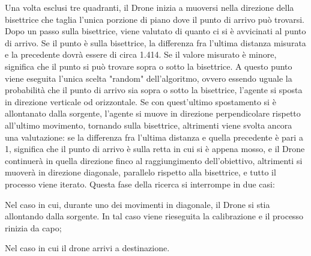 Una volta esclusi tre quadranti, il Drone inizia a muoversi nella direzione della bisettrice che taglia l'unica porzione di piano dove il punto di arrivo può trovarsi. Dopo un passo sulla bisettrice, viene valutato di quanto ci si è avvicinati al punto di arrivo. Se il punto è sulla bisettrice, la differenza fra l'ultima distanza misurata e la precedente dovrà essere di circa 1.414. Se il valore misurato è minore, significa che il punto si può trovare sopra o sotto la bisettrice. A questo punto viene eseguita l'unica scelta "random" dell'algoritmo, ovvero essendo uguale la probabilità che il punto di arrivo sia sopra o sotto la bisettrice, l'agente si sposta in direzione verticale od orizzontale. Se con quest'ultimo spostamento si è allontanato dalla sorgente, l'agente si muove in direzione perpendicolare rispetto all'ultimo movimento, tornando sulla bisettrice, altrimenti viene svolta ancora una valutazione: se la differenza fra l'ultima distanza e quella precedente è pari a 1, significa che il punto di arrivo è sulla retta in cui si è appena mosso, e il Drone continuerà in quella direzione finco al raggiungimento dell'obiettivo, altrimenti si muoverà in direzione diagonale, parallelo rispetto alla bisettrice, e tutto il processo viene iterato. Questa fase della ricerca si interrompe in due casi: 

Nel caso in cui, durante uno dei movimenti in diagonale, il Drone si stia allontando dalla sorgente. In tal caso viene rieseguita la calibrazione e il processo rinizia da capo;

Nel caso in cui il drone arrivi a destinazione.